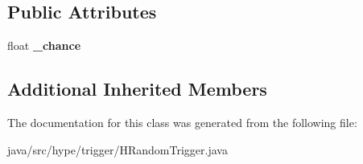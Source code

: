 \subsection*{Public Attributes}
\begin{DoxyCompactItemize}
\item 
\hypertarget{classhype_1_1trigger_1_1_h_random_trigger_a03d9a8e28bc1d8b0302cc8690d2a61bf}{float {\bfseries \-\_\-chance}}\label{classhype_1_1trigger_1_1_h_random_trigger_a03d9a8e28bc1d8b0302cc8690d2a61bf}

\end{DoxyCompactItemize}
\subsection*{Additional Inherited Members}


The documentation for this class was generated from the following file\-:\begin{DoxyCompactItemize}
\item 
java/src/hype/trigger/H\-Random\-Trigger.\-java\end{DoxyCompactItemize}

